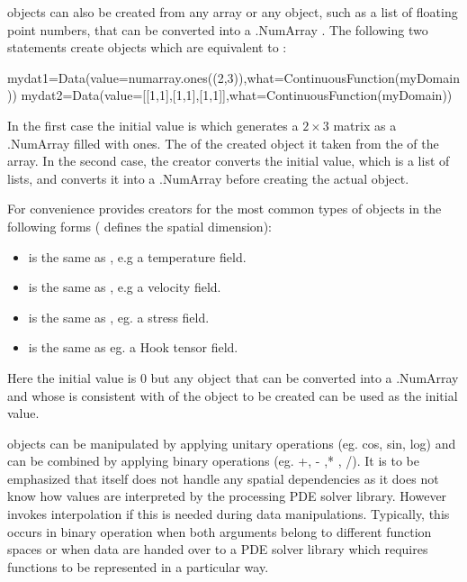 \Data objects can also be created from any \numarray
array or any object, such as a list of floating point numbers, 
that can be converted into a \numarray.NumArray . 
The following two statements
create objects which are equivalent to :
\begin{python}
mydat1=Data(value=numarray.ones((2,3)),what=ContinuousFunction(myDomain))
mydat2=Data(value=[[1,1],[1,1],[1,1]],what=ContinuousFunction(myDomain))
\end{python}
In the first case the initial value is 
which generates a $2 \times 3$ matrix as a \numarray.NumArray 
filled with ones. The \Shape of the created \Data object
it taken from the \Shape of the array. In the second
case, the creator converts the initial value, which is a list of lists,
and converts it into a \numarray.NumArray before creating the actual
\Data object.      

For convenience \escript provides creators for the most common types
of \Data objects in the following forms ( defines the 
spatial dimension):
\begin{itemize}
\item {} is the same as , 
e.g a temperature field. 
\item {}is the same as , e.g
a velocity field.   
\item {} is the same as ,
eg. a stress field.  
\item {} is the same as 
eg. a Hook tensor field.   
\end{itemize}
Here the initial value is $0$ but any object that can be converted into a \numarray.NumArray and whose \Shape
is consistent with \Shape of the \Data object to be created can be used as the initial value.

\Data objects can be manipulated by applying unitary operations (eg. cos, sin, log) 
and can be combined by applying binary operations (eg. +, - ,* , /). 
It is to be emphasized that \escript itself does not handle any spatial dependencies as 
it does not know how values are interpreted by the processing PDE solver library. 
However \escript invokes interpolation if this is needed during data manipulations. 
Typically, this occurs in binary operation when both arguments belong to different
function spaces or when data are handed over to a PDE solver library 
which requires functions to be represented in a particular way. 

